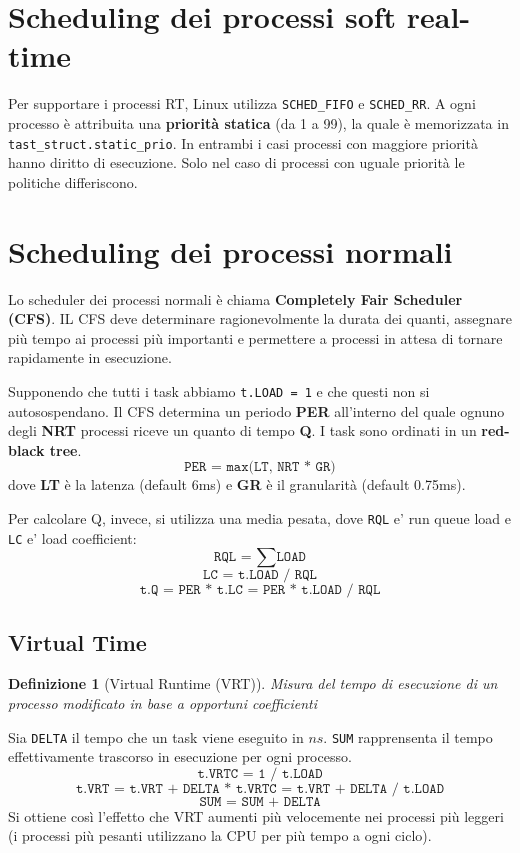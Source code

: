 \documentclass[12pt, a4paper]{report}
\newtheorem{definition}{Definizione}
\begin{document}
\section{Scheduling dei processi soft real-time}
Per supportare i processi RT, Linux utilizza \texttt{SCHED\_FIFO} e
\texttt{SCHED\_RR}. A ogni processo è attribuita una \textbf{priorità statica}
(da 1 a 99), la quale è memorizzata in \texttt{tast\_struct.static\_prio}.
In entrambi i casi processi con maggiore priorità hanno diritto di esecuzione.
Solo nel caso di processi con uguale priorità le politiche differiscono.

\section{Scheduling dei processi normali}
Lo scheduler dei processi normali è chiama \textbf{Completely Fair
Scheduler (CFS)}. IL CFS deve determinare ragionevolmente la durata dei
quanti, assegnare più tempo ai processi più importanti e permettere a processi
in attesa di tornare rapidamente in esecuzione.

Supponendo che tutti i task abbiamo \texttt{t.LOAD = 1} e che questi non si
autosospendano. Il CFS determina un periodo \textbf{PER} all'interno del quale
ognuno degli \textbf{NRT} processi riceve un quanto di tempo \textbf{Q}.
I task sono ordinati in un \textbf{red-black tree}.
\[
	\texttt{PER = max(LT, NRT * GR)}
\]
dove \textbf{LT} è la latenza (default 6ms) e \textbf{GR} è il granularità
(default 0.75ms).

Per calcolare Q, invece, si utilizza una media pesata, dove \texttt{RQL} e' run
queue load e \texttt{LC} e' load coefficient:
\[
	\texttt{RQL = } \sum \texttt{LOAD}
\]
\[
	\texttt{LC = t.LOAD / RQL}
\]
\[
	\texttt{t.Q = PER * t.LC = PER * t.LOAD / RQL}
\]

\subsection{Virtual Time}
\begin{definition}[Virtual Runtime (VRT)]
	Misura del tempo di esecuzione di un processo modificato in base a opportuni
	coefficienti
\end{definition}
Sia \texttt{DELTA} il tempo che un task viene eseguito in $ns$. \texttt{SUM}
rapprensenta il tempo effettivamente trascorso in esecuzione per ogni processo.
\[
	\texttt{t.VRTC = 1 / t.LOAD}
\]
\[
	\texttt{t.VRT = t.VRT + DELTA * t.VRTC = t.VRT + DELTA / t.LOAD}
\]
\[
	\texttt{SUM = SUM + DELTA}
\]
Si ottiene così l'effetto che VRT aumenti più velocemente nei processi più
leggeri (i processi più pesanti utilizzano la CPU per più tempo a ogni ciclo).
\end{document}
